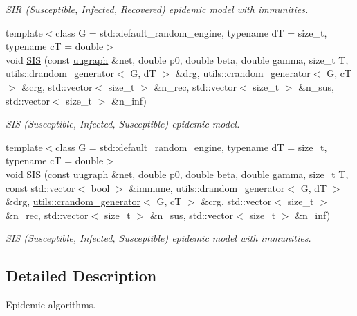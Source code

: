 \begin{DoxyCompactItemize}
\begin{DoxyCompactList}\small\item\em S\-I\-R (Susceptible, Infected, Recovered) epidemic model with immunities. \end{DoxyCompactList}\item 
{\footnotesize template$<$class G  = std\-::default\-\_\-random\-\_\-engine, typename d\-T  = size\-\_\-t, typename c\-T  = double$>$ }\\void \hyperlink{namespacelgraph_1_1networks_1_1epidemics_ab13c06a31d1bb67952af8bada055954a}{S\-I\-S} (const \hyperlink{classlgraph_1_1uugraph}{uugraph} \&net, double p0, double beta, double gamma, size\-\_\-t T, \hyperlink{classlgraph_1_1utils_1_1drandom__generator}{utils\-::drandom\-\_\-generator}$<$ G, d\-T $>$ \&drg, \hyperlink{classlgraph_1_1utils_1_1crandom__generator}{utils\-::crandom\-\_\-generator}$<$ G, c\-T $>$ \&crg, std\-::vector$<$ size\-\_\-t $>$ \&n\-\_\-rec, std\-::vector$<$ size\-\_\-t $>$ \&n\-\_\-sus, std\-::vector$<$ size\-\_\-t $>$ \&n\-\_\-inf)
\begin{DoxyCompactList}\small\item\em S\-I\-S (Susceptible, Infected, Susceptible) epidemic model. \end{DoxyCompactList}\item 
{\footnotesize template$<$class G  = std\-::default\-\_\-random\-\_\-engine, typename d\-T  = size\-\_\-t, typename c\-T  = double$>$ }\\void \hyperlink{namespacelgraph_1_1networks_1_1epidemics_a0ea6c12de2cf4ddf40808ce18de3e91b}{S\-I\-S} (const \hyperlink{classlgraph_1_1uugraph}{uugraph} \&net, double p0, double beta, double gamma, size\-\_\-t T, const std\-::vector$<$ bool $>$ \&immune, \hyperlink{classlgraph_1_1utils_1_1drandom__generator}{utils\-::drandom\-\_\-generator}$<$ G, d\-T $>$ \&drg, \hyperlink{classlgraph_1_1utils_1_1crandom__generator}{utils\-::crandom\-\_\-generator}$<$ G, c\-T $>$ \&crg, std\-::vector$<$ size\-\_\-t $>$ \&n\-\_\-rec, std\-::vector$<$ size\-\_\-t $>$ \&n\-\_\-sus, std\-::vector$<$ size\-\_\-t $>$ \&n\-\_\-inf)
\begin{DoxyCompactList}\small\item\em S\-I\-S (Susceptible, Infected, Susceptible) epidemic model with immunities. \end{DoxyCompactList}\end{DoxyCompactItemize}


\subsection{Detailed Description}
Epidemic algorithms. 

